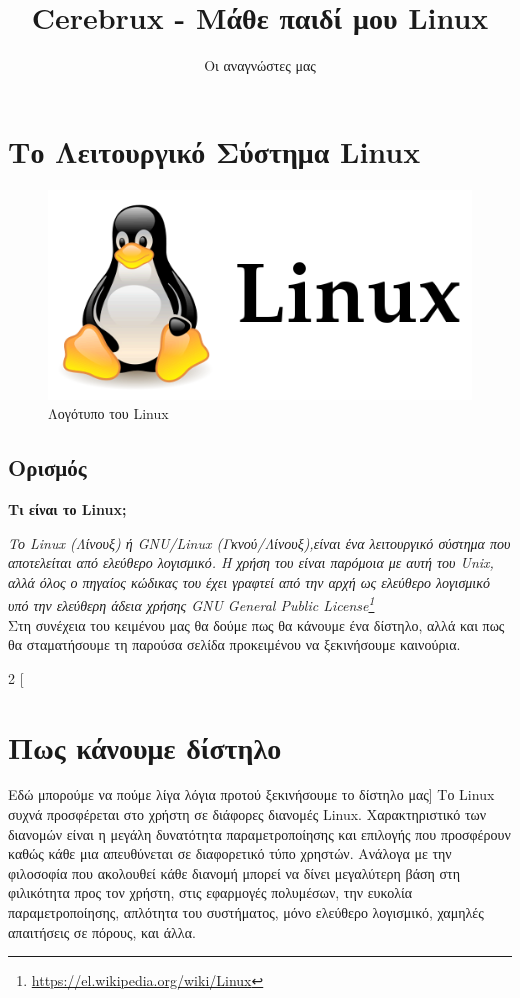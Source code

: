 \documentclass[a4paper,titlepage,oneside,12pt]{article}
\title{Cerebrux - Μάθε παιδί μου Linux}
\author{Οι αναγνώστες μας}
\newcommand\blankpage{%
    \null
    \thispagestyle{empty}%
    \addtocounter{page}{-1}%
    \newpage}
\begin{document}
\newpage
\blankpage 
 
\section{Το Λειτουργικό Σύστημα Linux} 
 
\begin{figure} [!hbp]
\centering
\includegraphics[width=1\linewidth]{linux-logo.png} 
\caption{Λογότυπο του Linux}
\end{figure}
 
\subsection{Ορισμός}
\textbf{Τι είναι το Linux;}
 
\textit{Το Linux (Λίνουξ) ή GNU/Linux (Γκνού/Λίνουξ),είναι ένα λειτουργικό σύστημα που αποτελείται από ελεύθερο λογισμικό. Η χρήση του είναι παρόμοια με αυτή του Unix, αλλά όλος ο πηγαίος κώδικας του έχει γραφτεί από την αρχή ως ελεύθερο λογισμικό υπό την ελεύθερη άδεια χρήσης GNU General Public License\footnote{\url{https://el.wikipedia.org/wiki/Linux}}}\\
Στη συνέχεια του κειμένου μας θα δούμε πως θα κάνουμε ένα δίστηλο, αλλά και πως θα σταματήσουμε τη παρούσα σελίδα προκειμένου να ξεκινήσουμε καινούρια.
\pagebreak
 
\begin{multicols}{2}
[
\section{Πως κάνουμε δίστηλο}
Εδώ μπορούμε να πούμε λίγα λόγια προτού ξεκινήσουμε το δίστηλο μας]
Το Linux συχνά προσφέρεται στο χρήστη σε διάφορες διανομές Linux. Χαρακτηριστικό των διανομών είναι η μεγάλη δυνατότητα παραμετροποίησης και επιλογής που προσφέρουν καθώς κάθε μια απευθύνεται σε διαφορετικό τύπο χρηστών. Ανάλογα με την φιλοσοφία που ακολουθεί κάθε διανομή μπορεί να δίνει μεγαλύτερη βάση στη φιλικότητα προς τον χρήστη, στις εφαρμογές πολυμέσων, την ευκολία παραμετροποίησης, απλότητα του συστήματος, μόνο ελεύθερο λογισμικό, χαμηλές απαιτήσεις σε πόρους, και άλλα.
\end{multicols}
 
\end{document}
